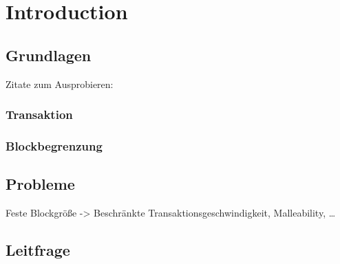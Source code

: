 
\section{Introduction}
\label{ch:Introduction}



\subsection{Grundlagen}
\label{sec:Introduction:Grundlagen}
Zitate zum Ausprobieren: \cite{mycryptopedia:segwit} \cite{mycryptopedia:txid} \cite{mycryptopedia:malleability} \cite{springer:malleability_and_mtgox} \cite{Singh2020}
\subsubsection{Transaktion}
\label{sec:Introduction:Grundlagen:Transaktion}

\subsubsection{Blockbegrenzung}
\label{sec:Introduction:Grundlagen:Blockbegrenzung}

\subsection{Probleme}
\label{sec:Introduction:Probleme}

Feste Blockgröße -> Beschränkte Transaktionsgeschwindigkeit, Malleability, \dots


\subsection{Leitfrage}
